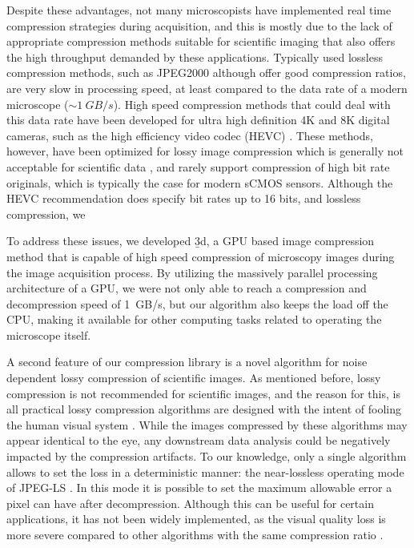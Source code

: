   Despite these advantages, not many microscopists have implemented real time compression strategies during acquisition, and this is mostly due to the lack of appropriate compression methods suitable for scientific imaging that also offers the high throughput demanded by these applications. Typically used lossless compression methods, such as JPEG2000 \cite{adams_jpeg-2000_2001} although offer good compression ratios, are very slow in processing speed, at least compared to the data rate of a modern microscope ($\sim \SI{1}{GB/s}$). High speed compression methods that could deal with this data rate have been developed for ultra high definition 4K and 8K digital cameras, such as the high efficiency video codec (HEVC) \cite{international_telecommunications_union_h.265_2016}. These methods, however, have been optimized for lossy image compression which is generally not acceptable for scientific data \cite{cromey_digital_2013}, and rarely support compression of high bit rate originals, which is typically the case for modern sCMOS sensors. Although the HEVC recommendation does specify bit rates up to 16 bits, and lossless compression, we

  To address these issues, we developed \b3d, a GPU based image compression method that is capable of high speed compression of microscopy images during the image acquisition process. By utilizing the massively parallel processing architecture of a GPU, we were not only able to reach a compression and decompression speed of \SI{1}{GB/s}, but our algorithm also keeps the load off the CPU, making it available for other computing tasks related to operating the microscope itself.

  A second feature of our compression library is a novel algorithm for noise dependent lossy compression of scientific images. As mentioned before, lossy compression is not recommended for scientific images, and the reason for this, is all practical lossy compression algorithms are designed with the intent of fooling the human visual system \cite{sayood_introduction_2012}. While the images compressed by these algorithms may appear identical to the eye, any downstream data analysis could be negatively impacted by the compression artifacts. To our knowledge, only a single algorithm allows to set the loss in a deterministic manner: the near-lossless operating mode of JPEG-LS \cite{weinberger_loco-i_2000}. In this mode it is possible to set the maximum allowable error a pixel can have after decompression. Although this can be useful for certain applications, it has not been widely implemented, as the visual quality loss is more severe compared to other algorithms with the same compression ratio \cite{santa-cruz_study_2000}.




